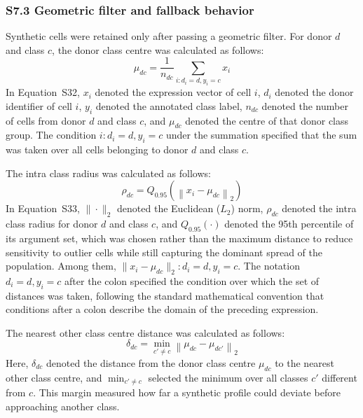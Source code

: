 \documentclass[11pt]{article}
\begin{document}
\subsubsection*{S7.3 Geometric filter and fallback behavior}

Synthetic cells were retained only after passing a geometric filter. For donor \(d\) and class \(c\), the donor class centre was calculated as follows:
\begin{equation}
\mu_{dc} = \frac{1}{n_{dc}}\sum_{i:d_i=d,y_i=c} x_i
\label{eq:donor_class_center}
\end{equation}
In Equation~S32, \(x_i\) denoted the expression vector of cell \(i\), \(d_i\) denoted the donor identifier of cell \(i\), \(y_i\) denoted the annotated class label, \(n_{dc}\) denoted the number of cells from donor \(d\) and class \(c\), and \(\mu_{dc}\) denoted the centre of that donor class group. The condition \(i : d_i = d, y_i = c\) under the summation specified that the sum was taken over all cells belonging to donor \(d\) and class \(c\).

The intra class radius was calculated as follows:
\begin{equation}
\rho_{dc} =
Q_{0.95}\left(\left\|x_i-\mu_{dc}\right\|_2\right)
\label{eq:donor_class_radius}
\end{equation}
In Equation~S33, \(\|\cdot\|_2\) denoted the Euclidean (\(L_2\)) norm, \(\rho_{dc}\) denoted the intra class radius for donor \(d\) and class \(c\), and \(Q_{0.95}(\cdot)\) denoted the 95th percentile of its argument set, which was chosen rather than the maximum distance to reduce sensitivity to outlier cells while still capturing the dominant spread of the population. Among them, \(\|x_i-\mu_{dc}\|_2: d_i=d, y_i=c\). The notation \(d_i = d, y_i = c\) after the colon specified the condition over which the set of distances was taken, following the standard mathematical convention that conditions after a colon describe the domain of the preceding expression.

The nearest other class centre distance was calculated as follows:
\begin{equation}
\delta_{dc} =
\min_{c' \ne c}\left\|\mu_{dc}-\mu_{dc'}\right\|_2
\label{eq:nearest_class_margin}
\end{equation}
Here, \(\delta_{dc}\) denoted the distance from the donor class centre \(\mu_{dc}\) to the nearest other class centre, and \(\min_{c' \ne c}\) selected the minimum over all classes \(c'\) different from \(c\). This margin measured how far a synthetic profile could deviate before approaching another class.
\end{document}
